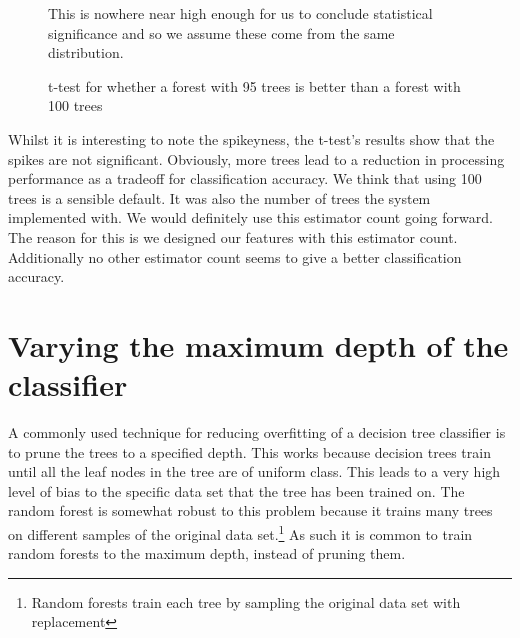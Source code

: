 \documentclass[ %
                    author={Sam Phippen},
                supervisor={Dr. Rafal Bogacz},
                     title={Real time voice activity detectors in noisy personal computing environments},
                  subtitle={},
                    degree={MEng},
                      year={2012} ]{thesis}
\begin{document}
\begin{figure}

    This is nowhere near high enough for us to conclude statistical significance and so we assume these come from the same distribution.

    \caption{t-test for whether a forest with 95 trees is better than a forest with 100 trees}

    \label{fig:t-test}

\end{figure}

Whilst it is interesting to note the spikeyness, the t-test's results show that
the spikes are not significant. Obviously, more trees lead to a reduction in
processing performance as a tradeoff for classification accuracy.  We think
that using 100 trees is a sensible default. It was also the number of trees the
system implemented with.  We would definitely use this estimator count going
forward. The reason for this is we designed our features with this estimator
count. Additionally no other estimator count seems to give a better
classification accuracy.

\section{Varying the maximum depth of the classifier}

A commonly used technique for reducing overfitting of a decision tree
classifier is to prune the trees to a specified
depth\cite{Bramer:2002:PCT:646288.686755}. This works because decision trees
train until all the leaf nodes in the tree are of uniform class. This leads to
a very high level of bias to the specific data set that the tree has been
trained on. The random forest is somewhat robust to this problem because it
trains many trees on different samples of the original data
set.\footnote{Random forests train each tree by sampling the original data set
with replacement} As such it is common to train random forests to the maximum
depth, instead of pruning them.
\end{document}
